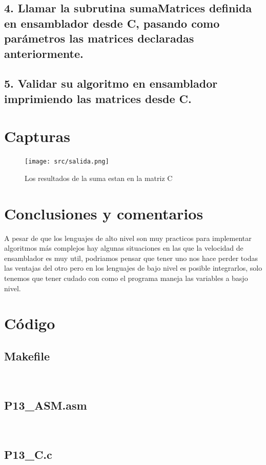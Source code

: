 \documentclass[10pt]{article}
\begin{document}
\subsection*{4. Llamar la subrutina sumaMatrices definida en ensamblador desde C, pasando como parámetros las matrices declaradas anteriormente.}
\label{sec:orgbfecc9f}


\subsection*{5. Validar su algoritmo en ensamblador imprimiendo las matrices desde C.}
\label{sec:org7df1f4a}



\section*{Capturas}
\label{sec:org3265490}
\begin{figure}[htbp]
\centering
\texttt{[image: src/salida.png]}
\caption{Los resultados de la suma estan en la matriz C}
\end{figure}

\section*{Conclusiones y comentarios}
\label{sec:org70de80b}
A pesar de que los lenguajes de alto nivel son muy practicos para implementar algoritmos más complejos hay algunas situaciones en las que la velocidad de ensamblador es muy util, podriamos pensar que tener uno nos hace perder todas las ventajas del otro pero en los lenguajes de bajo nivel es posible integrarlos, solo tenemos que tener cudado con como el programa maneja las variables a basjo nivel.

\pagebreak

\section*{Código}
\label{sec:org9e19f19}
\subsection*{Makefile}
\label{sec:org0c6ea52}
\\ 

\subsection*{P13\_ASM.asm}
\label{sec:org0a051fd}
\\ 

\subsection*{P13\_C.c}
\label{sec:org5c39983}
\\ 
\end{document}
